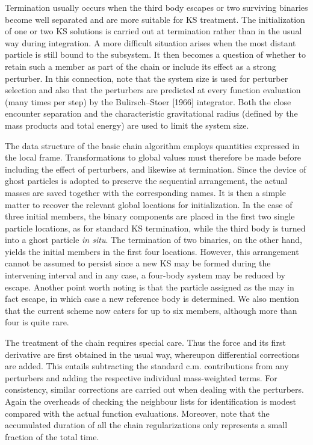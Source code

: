 \documentclass[12pt]{article}
\begin{document}
Termination usually occurs when the third body escapes or two surviving
binaries become well separated and are more suitable for KS treatment.
The initialization of one or two KS solutions is carried out at termination
rather than in the usual way during integration.
A more difficult situation arises when the most distant particle is still
bound to the subsystem.
It then becomes a question of whether to retain such a member as part of
the chain or include its effect as a strong perturber.
In this connection, note that the system size is used for perturber
selection and also that the perturbers are predicted at every function
evaluation (\ie many times per step) by the Bulirsch--Stoer [1966]
integrator.
Both the close encounter separation and the characteristic gravitational
radius (defined by the mass products and total energy) are used to limit
the system size.

The data structure of the basic chain algorithm employs quantities expressed
in the local \cm frame.
Transformations to global values must therefore be made before including the
effect of perturbers, and likewise at termination.
Since the device of ghost particles is adopted to preserve the sequential
arrangement, the actual masses are saved together with the corresponding
names.
It is then a simple matter to recover the relevant global locations for
initialization.
In the case of three initial members, the binary components are placed in the
first two single particle locations, as for standard KS termination, while
the third body is turned into a ghost particle {\it in situ}.
The termination of two binaries, on the other hand, yields the initial
members in the first four locations.
However, this arrangement cannot be assumed to persist since a new KS may be
formed during the intervening interval and in any case, a four-body system
may be reduced by escape.
Another point worth noting is that the particle assigned as the \cm may in
fact escape, in which case a new reference body is determined.
We also mention that the current scheme now caters for up to six members,
although more than four is quite rare.

The treatment of the chain \cm requires special care.
Thus the force and its first derivative are first obtained in the usual way,
whereupon differential corrections are added.
This entails subtracting the standard c.m. contributions from any perturbers
and adding the respective individual mass-weighted terms.
For consistency, similar corrections are carried out when dealing with the
perturbers.
Again the overheads of checking the neighbour lists for identification is
modest compared with the actual function evaluations.
Moreover, note that the accumulated duration of all the chain
regularizations only represents a small fraction of the total time.
\end{document}
